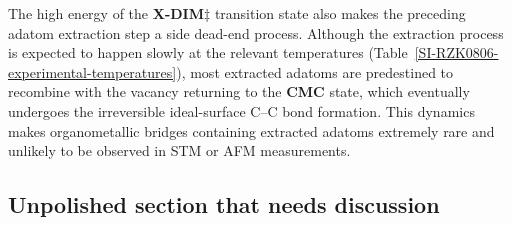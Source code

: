 \documentclass[journal=jacsat,manuscript=article]{achemso}
\newcommand{\lock}{\color{red}}
\newcommand{\lock}{\color{black}}
\begin{document}


{\lock

The high energy of the \textbf{X-DIM$\ddagger$} transition state also makes the preceding adatom extraction step a side dead-end process. Although the extraction process is expected to happen slowly at the relevant temperatures (Table~\ref{SI-RZK0806-experimental-temperatures}), most extracted adatoms are predestined to recombine with the vacancy returning to the \textbf{CMC} state, which eventually undergoes the irreversible ideal-surface C--C bond formation. 
%
%
This dynamics makes organometallic bridges containing extracted adatoms extremely rare and unlikely to be observed in STM or AFM measurements.

}

\ifdefined\INTERNAL
\subsection{Unpolished section that needs discussion}
\end{document}
